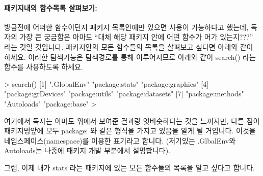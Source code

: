 \documentclass[tutorial.tex]{subfiles}
\begin{document}
\paragraph{패키지내의 함수목록 살펴보기: }
방금전에 어떠한 함수이던지 패키지 목록안에만 있으면 사용이 가능하다고 했는데, 독자의 가장 큰 궁금함은 아마도 ``대체 해당 패키지 안에 어떤 함수가 머가 있는지???'' 라는 것일 것입니다. 
패키지안의 모든 함수들의 목록을 살펴보고 싶다면 아래와 같이 하세요.
이러한 탐색기능은 탐색경로를 통해 이루어지므로 아래와 같이 search() 라는 함수를 사용하도록 하세요.

\begin{Schunk}
\begin{Soutput}
> search()
[1] ".GlobalEnv"        "package:stats"     "package:graphics" 
[4] "package:grDevices" "package:utils"     "package:datasets" 
[7] "package:methods"   "Autoloads"         "package:base"     
> 
\end{Soutput}
\end{Schunk}

여기에서 독자는 아마도 위에서 보여준 결과랑 엇비슷하다는 것을 느끼지만, 다른 점이 패키지명앞에 모두 package: 와 같은 형식을 가지고 있음을 알게 될 거입니다. 
이것을 네임스페이스(namespace)를 이용한 표기라고 합니다. 
(저기있는 .GlbalEnv와 Autoloads는 나중에 패키지 개발 부분에서 설명합니다).

그럼, 이제 내가 stats 라는 패키지에 있는 모든 함수들의 목록을 알고 싶다고 합니다. 
\end{document}
